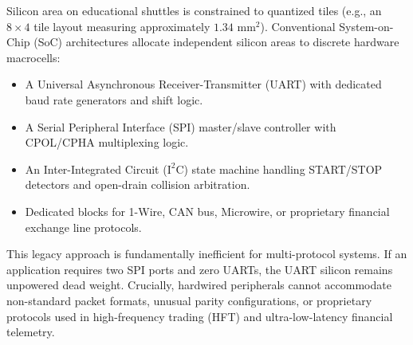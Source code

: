 \documentclass[11pt,a4paper]{article}
\begin{document}
Silicon area on educational shuttles is constrained to quantized tiles (e.g., an $8 \times 4$ tile layout measuring approximately $1.34\text{ mm}^2$). Conventional System-on-Chip (SoC) architectures allocate independent silicon areas to discrete hardware macrocells:
\begin{itemize}
    \item A Universal Asynchronous Receiver-Transmitter (UART) with dedicated baud rate generators and shift logic.
    \item A Serial Peripheral Interface (SPI) master/slave controller with CPOL/CPHA multiplexing logic.
    \item An Inter-Integrated Circuit ($\text{I}^2\text{C}$) state machine handling START/STOP detectors and open-drain collision arbitration.
    \item Dedicated blocks for 1-Wire, CAN bus, Microwire, or proprietary financial exchange line protocols.
\end{itemize}
This legacy approach is fundamentally inefficient for multi-protocol systems. If an application requires two SPI ports and zero UARTs, the UART silicon remains unpowered dead weight. Crucially, hardwired peripherals cannot accommodate non-standard packet formats, unusual parity configurations, or proprietary protocols used in high-frequency trading (HFT) and ultra-low-latency financial telemetry.
\end{document}
